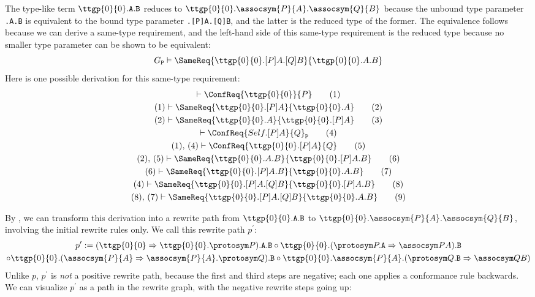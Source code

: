 \documentclass[../generics]{subfiles}
\begin{document}
\begin{example}
The type-like term $\ttgp{0}{0}.\texttt{A}.\texttt{B}$ reduces to $\ttgp{0}{0}.\assocsym{P}{A}.\assocsym{Q}{B}$ because the unbound type parameter \texttt{.A.B} is equivalent to the bound type parameter \texttt{.[P]A.[Q]B}, and the latter is the reduced type of the former. The equivalence follows because we can derive a same-type requirement, and the left-hand side of this same-type requirement is the reduced type because no smaller type parameter can be shown to be equivalent:
\[G_\texttt{P}\vDash\SameReq{\ttgp{0}{0}.[P]A.[Q]B}{\ttgp{0}{0}.A.B}\]
Here is one possible derivation for this same-type requirement:
\begin{gather*}
\vdash\ConfReq{\ttgp{0}{0}}{P}\tag{1}\\
(1)\vdash\SameReq{\ttgp{0}{0}.[P]A}{\ttgp{0}{0}.A}\tag{2}\\
(2)\vdash\SameReq{\ttgp{0}{0}.A}{\ttgp{0}{0}.[P]A}\tag{3}\\
\vdash\ConfReq{Self.[P]A}{Q}_\texttt{P}\tag{4}\\
(1),\,(4)\vdash\ConfReq{\ttgp{0}{0}.[P]A}{Q}\tag{5}\\
(2),\,(5)\vdash\SameReq{\ttgp{0}{0}.A.B}{\ttgp{0}{0}.[P]A.B}\tag{6}\\
(6)\vdash\SameReq{\ttgp{0}{0}.[P]A.B}{\ttgp{0}{0}.A.B}\tag{7}\\
(4)\vdash\SameReq{\ttgp{0}{0}.[P]A.[Q]B}{\ttgp{0}{0}.[P]A.B}\tag{8}\\
(8),\,(7)\vdash\SameReq{\ttgp{0}{0}.[P]A.[Q]B}{\ttgp{0}{0}.A.B}\tag{9}
\end{gather*}

By , we can transform this derivation into a rewrite path from $\ttgp{0}{0}.\texttt{A}.\texttt{B}$ to $\ttgp{0}{0}.\assocsym{P}{A}.\assocsym{Q}{B}$, involving the initial rewrite rules only. We call this rewrite path $p^\prime$:
\begin{multline*}
p^\prime := (\ProtoConfInv{\ttgp{0}{0}}{P}).\texttt{A}.\texttt{B} \circ \ttgp{0}{0}.(\AssocIntro{P}{A}).\texttt{B}\\
\circ \ttgp{0}{0}.(\ProtoConfInv{\assocsym{P}{A}}{Q}).\texttt{B} \circ \ttgp{0}{0}.\assocsym{P}{A}.(\AssocIntro{Q}{B})
\end{multline*}
Unlike $p$, $p^\prime$ is \emph{not} a positive rewrite path, because the first and third steps are negative; each one applies a conformance rule backwards. We can visualize $p^\prime$ as a path in the rewrite graph, with the negative rewrite steps going up:
\begin{center}
\end{center}


\end{example}
\end{document}
